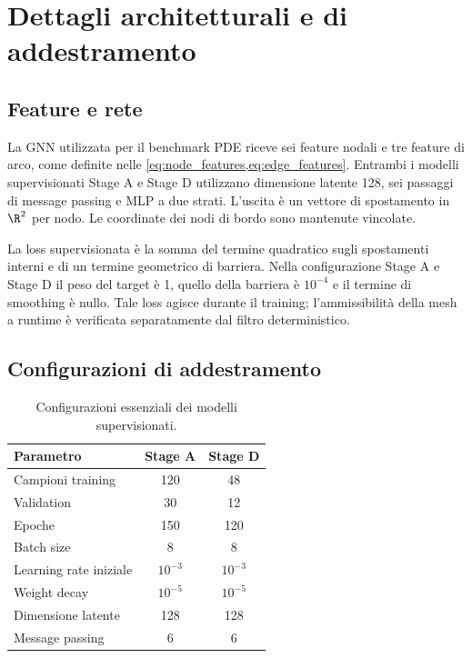 \section{Dettagli architetturali e di addestramento}
\label{app:architettura}

\subsection{Feature e rete}

La GNN utilizzata per il benchmark PDE riceve sei feature nodali e tre feature di arco, come definite nelle \cref{eq:node_features,eq:edge_features}. Entrambi i modelli supervisionati Stage A e Stage D utilizzano dimensione latente 128, sei passaggi di message passing e MLP a due strati. L'uscita è un vettore di spostamento in $\R^2$ per nodo. Le coordinate dei nodi di bordo sono mantenute vincolate.

La loss supervisionata è la somma del termine quadratico sugli spostamenti interni e di un termine geometrico di barriera. Nella configurazione Stage A e Stage D il peso del target è 1, quello della barriera è $10^{-4}$ e il termine di smoothing è nullo. Tale loss agisce durante il training; l'ammissibilità della mesh a runtime è verificata separatamente dal filtro deterministico.

\subsection{Configurazioni di addestramento}

\begin{table}[tbp]
\centering
\footnotesize
\caption{Configurazioni essenziali dei modelli supervisionati.}
\label{tab:app_training_configs}
\begin{tabular}{lcc}
\toprule
Parametro & Stage A & Stage D\\
\midrule
Campioni training & 120 & 48\\
Validation & 30 & 12\\
Epoche & 150 & 120\\
Batch size & 8 & 8\\
Learning rate iniziale & $10^{-3}$ & $10^{-3}$\\
Weight decay & $10^{-5}$ & $10^{-5}$\\
Dimensione latente & 128 & 128\\
Message passing & 6 & 6\\
\bottomrule
\end{tabular}
\end{table}

